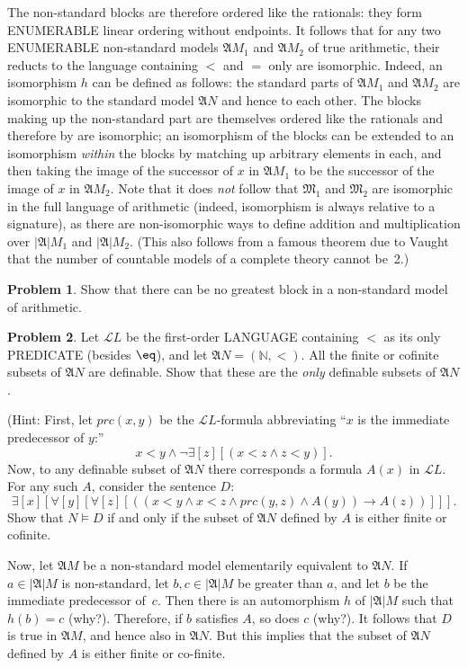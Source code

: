 \documentclass[10pt,a4paper]{article}
\makeatletter
\newcommand*{\olup}[1]{\MakeUppercase{#1}}
\theoremstyle{plain}
\theoremstyle{definition}
\newtheorem{prob}{Problem}[section]
\theoremstyle{remark}
\newcommand{\olref}{\@ifnextchar[{\olref@i}{\olref@final}}
\def\olref@i[#1]{\@ifnextchar[{\olref@ii}{\olref@final}}
\def\olref@ii[#1]{\@ifnextchar[{\olref@iii}{\olref@final}}
\def\olref@iii[#1]{\olref@final}
\def\olref@final#1{\ref{#1}}
\providecommand{\lif}{\mathbin{\rightarrow}}
\providecommand{\lforall}{\mathord{\forall}}
\providecommand{\lexists}{\mathord{\exists}}
\providecommand{\Obj}{}
\providecommand{\Struct}{\ensuremath{\mathfrak{A}}}
\providecommand{\Domain}{\ensuremath{|\mathfrak{A}|}}
\providecommand{\Sat}[2]{\ensuremath{#1 \models #2}}
\providecommand{\Lang}{\ensuremath{\mathcal{L}}}
\providecommand{\Nat}{\ensuremath{\mathbb{N}}}
\makeatother
\begin{document}
The non-standard blocks are therefore ordered like the rationals: they
form \olup{enumerable} linear ordering without endpoints.  It follows
that for any two \olup{enumerable} non-standard models $\Struct{M}_1$ and
$\Struct{M_2}$ of true arithmetic, their reducts to the language
containing $<$ and $=$ only are isomorphic. Indeed, an isomorphism $h$
can be defined as follows: the standard parts of $\Struct{M_1}$ and
$\Struct{M_2}$ are isomorphic to the standard model $\Struct{N}$ and
hence to each other. The blocks making up the non-standard part are
themselves ordered like the rationals and therefore by
\olref[dlo]{thm:cantorQ} are isomorphic; an isomorphism of the blocks
can be extended to an isomorphism \emph{within} the blocks by matching
up arbitrary elements in each, and then taking the image of the
successor of $x$ in $\Struct{M_1}$ to be the successor of the image of
$x$ in $\Struct{M_2}$. Note that it does \emph{not} follow that
$\mathfrak{M}_1$ and $\mathfrak{M}_2$ are isomorphic in the full
language of arithmetic (indeed, isomorphism is always relative to a
signature), as there are non-isomorphic ways to define addition and
multiplication over $\Domain{M_1}$ and $\Domain{M_2}$. (This also
follows from a famous theorem due to Vaught that the number of
countable models of a complete theory cannot be~2.)

\begin{prob}
Show that there can be no greatest block in a non-standard model of
arithmetic.
\end{prob}

\begin{prob} 
Let $\Lang{L}$ be the first-order \olup{language} containing $<$ as its
only \olup{predicate} (besides $\eq$), and let $\Struct{N} = (\Nat,
<)$. All the finite or cofinite subsets of $\Struct{N}$ are
definable. Show that these are the \emph{only} definable subsets of
$\Struct{N}$.
 
(Hint: First, let $\Obj{prc}(x,y)$ be the
$\Lang{L}$-formula abbreviating ``$x$ is the immediate predecessor
of $y$:''
\[
x<y \land \lnot \lexists[z][(x<z \land z < y)].
\]
Now, to any definable subset of $\Struct{N}$ there corresponds a
formula $A(x)$ in $\Lang{L}$. For any such $A$,
consider the sentence $D$:
\[
\lexists[x][\lforall[y][\lforall[z][((x<y \land x<z \land \Obj{prc}(y,z)
  \land A(y)) \lif A(z))]]].
\]
Show that $\Sat{N}{D}$ if and only if the subset of
$\Struct{N}$ defined by $A$ is either finite or cofinite.

Now, let $\Struct{M}$ be a non-standard model elementarily
equivalent to $\Struct{N}$.  If $a \in \Domain{M}$ is
non-standard, let $b, c \in \Domain{M}$ be greater than $a$, and
let $b$ be the immediate predecessor of~$c$. Then there is an
automorphism $h$ of $\Domain{M}$ such that $h(b)=c$
(why?). Therefore, if $b$ satisfies $A$, so does $c$ (why?). It
follows that $D$ is true in $\Struct{M}$, and hence also in
$\Struct{N}$. But this implies that the subset of $\Struct{N}$
defined by $A$ is either finite or co-finite.
\end{prob}
\end{document}
